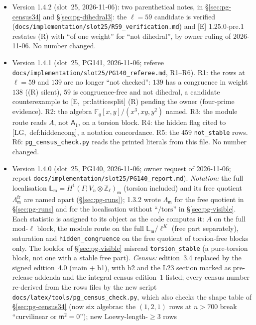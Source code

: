 \documentclass[11pt]{article}
\newcommand{\F}{\mathbb{F}}
\newcommand{\Zl}{\mathbb{Z}_\ell}
\newcommand{\m}{\mathfrak{m}}
\newcommand{\GL}{\mathrm{GL}}
\newcommand{\Ga}{\Gamma}
\newcommand{\code}[1]{\texttt{#1}}
\newcommand{\file}[1]{\texttt{#1}}
\newcommand{\pfile}[1]{\nolinkurl{#1}}
\begin{document}
\begin{itemize}[leftmargin=1.6em,itemsep=2pt]
  cited''). Former author line: ``The orbifold-cohomology-of-$\GL_2$ project''. The figures remain in \S\ref{sec:pg-runs}. No number changed.
\item Version 1.4.2 (slot~25, 2026-11-06): two parenthetical notes, in \S\ref{sec:pg-census34} and \S\ref{sec:pg-dihedral3}: the $\ell=59$ candidate is
  verified (\pfile{docs/implementation/slot25/R59_verification.md}) and [E] 1.25.0-pre.1 restates (R) with ``of one weight'' for ``not dihedral'', by owner
  ruling of 2026-11-06. No number changed.
\item Version 1.4.1 (slot~25, PG141, 2026-11-06; referee \pfile{docs/implementation/slot25/PG140_referee.md}, R1--R6). R1: the rows at $\ell=59$ and $139$
  are no longer ``not checked'': $139$ has a congruence in weight $138$ ((R) silent), $59$ is congruence-free and not dihedral, a candidate counterexample
  to [E,~pr:latticesplit] (R) pending the owner (four-prime evidence). R2: the algebra $\F_q[x,y]/(x^{3},xy,y^{2})$ named. R3: the module route reads $A$, not $\mathsf A_1$, on
  a torsion block. R4: the hidden flag cited to [LG,~def:hiddencong], a notation concordance. R5: the $459$ \code{not\_stable} rows. R6: \file{pg\_census\_check.py}
  reads the printed literals from this file. No number changed.
\item Version 1.4.0 (slot~25, PG140, 2026-11-06; owner request of 2026-11-06; report \pfile{docs/implementation/slot25/PG140_report.md}).
  \emph{Notation:} the full localisation $\mathbb L_\m=H^{1}(\Ga;V_n\otimes\Zl)_\m$ (torsion included) and its free quotient
  $\Lambda^{\mathrm{fr}}_\m$ are named apart (\S\ref{sec:pg-runs}); 1.3.2 wrote $\Lambda_\m$ for the free quotient in \S\ref{sec:pg-runs} and for
  the localisation without ``$/\mathrm{tors}$'' in \S\ref{sec:pg-visible}. Each statistic is assigned to its object as the code computes it: $A$
  on the full mod-$\ell$ block, the module route on the full $\mathbb L_\m/\ell^{K}$ (free part separately), saturation and
  \code{hidden\_congruence} on the free quotient of torsion-free blocks only. The lookfor of \S\ref{sec:pg-visible} misread
  \code{torsion\_stable} (a pure-torsion block, not one with a stable free part). \emph{Census:} edition~3.4 replaced by the signed edition~4.0
  (main $+$ b1), with b2 and the L23 section marked as pre-release addenda and the integral census edition~1 listed; every census number
  re-derived from the rows files by the new script \file{docs/latex/tools/pg\_census\_check.py}, which also checks the shape table of
  \S\ref{sec:pg-census34} (now six algebras: the $(1,2,1)$ rows at $n>700$ break ``curvilinear or $\m^{2}=0$''); new Loewy-length-$\ge3$ rows

\end{itemize}
\end{document}
